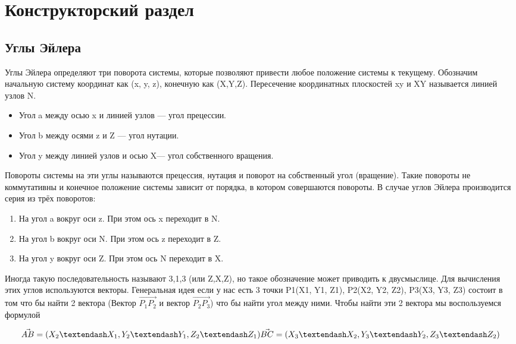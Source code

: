 \chapter{Конструкторский раздел}


\section{Углы Эйлера}
\hspace{0.6cm} Углы Эйлера определяют три поворота системы, которые позволяют привести любое положение системы к текущему. Обозначим начальную систему координат как (x, y, z), конечную как (X,Y,Z). Пересечение координатных плоскостей xy и XY называется линией узлов N.
\begin{itemize}
	\item Угол a между осью x и линией узлов — угол прецессии.
	\item Угол b между осями z и Z — угол нутации.
	\item Угол y между линией узлов и осью  X— угол собственного вращения.
\end{itemize}

\hspace{0.6cm} Повороты системы на эти углы называются прецессия, нутация и поворот на собственный угол (вращение). Такие повороты не коммутативны и конечное положение системы зависит от порядка, в котором совершаются повороты. В случае углов Эйлера производится серия из трёх поворотов:
\begin{enumerate}
	\item На угол a вокруг оси z. При этом ось x переходит в N.
	\item На угол b вокруг оси N. При этом ось z переходит в Z.
	\item На угол y вокруг оси Z. При этом ось N переходит в X.
\end{enumerate}

\hspace{0.6cm} Иногда такую последовательность называют 3,1,3 (или Z,X,Z), но такое обозначение может приводить к двусмыслице.
\hspace{0.6cm} Для вычисления этих углов используются векторы. Генеральная идея если у нас есть 3 точки P1(X1, Y1, Z1),  P2(X2, Y2, Z2),  P3(X3, Y3, Z3) состоит в том что бы найти 2 вектора (Вектор $\vec{P_{1}P_{2}}$ и вектор $\vec{P_{2}P_{3}}$) что бы найти угол между ними. Чтобы найти эти 2 вектора мы воспользуемся формулой

\begin{equation} 
\displaystyle \vec{AB} = (X_2 – X_1, Y_2 – Y_1, Z_2 – Z_1)\\
\vec{BC} = (X_3 – X_2, Y_3 – Y_2, Z_3 – Z_2) 
\end{equation}

